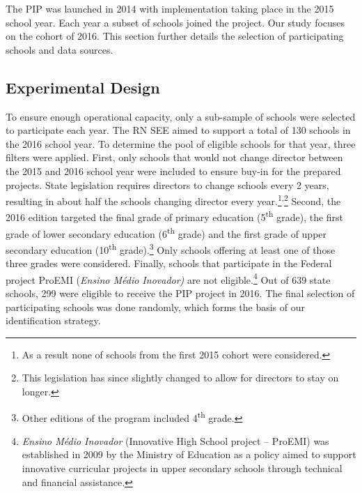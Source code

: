 \documentclass[11pt,a4paper]{article}
\begin{document}
	The PIP was launched in 2014 with implementation taking place in the 2015 school year. Each year a subset of schools joined the project. Our study focuses on the cohort of 2016. This section further details the selection of participating schools and data sources.
	
	\subsection{Experimental Design} \label{sec:experiment}
	
	To ensure enough operational capacity, only a sub-sample of schools were selected to participate each year. The RN SEE aimed to support a total of 130 schools in the 2016 school year. To determine the pool of eligible schools for that year, three filters were applied. First, only schools that would not change director between the 2015 and 2016 school year were included to ensure buy-in for the prepared projects. State legislation requires directors to change schools every 2 years, resulting in about half the schools changing director every year.\footnote{As a result none of schools from the first 2015 cohort were considered.}\textsuperscript{,}\footnote{This legislation has since slightly changed to allow for directors to stay on longer.} Second, the 2016 edition targeted the final grade of primary education (5\textsuperscript{th} grade), the first grade of lower secondary education (6\textsuperscript{th} grade) and the first grade of upper secondary education (10\textsuperscript{th} grade).\footnote{Other editions of the program included 4\textsuperscript{th} grade.} Only schools offering at least one of those three grades were considered. Finally, schools that participate in the Federal project ProEMI (\textit{Ensino Médio Inovador)} are not eligible.\footnote{\textit{Ensino Médio Inovador} (Innovative High School project -- ProEMI) was established in 2009 by the Ministry of Education as a policy aimed to support innovative curricular projects in upper secondary schools through technical and financial assistance.} Out of 639 state schools, 299 were eligible to receive the PIP project in 2016. The final selection of participating schools was done randomly, which forms the basis of our identification strategy. 
	
\end{document}
